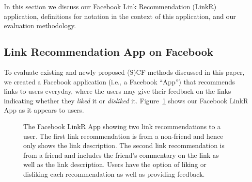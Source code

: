 In this section we discuss our Facebook Link Recommendation
(LinkR) application, definitions for 
notation in the context of this application, and our evaluation
methodology.

\subsection{Link Recommendation App on Facebook}

To evaluate existing and newly proposed (S)CF methods discussed in
this paper, we created a Facebook application (i.e., a Facebook
``App'') that recommends links to users everyday, where the users may
give their feedback on the links indicating whether they \emph{liked}
it or \emph{disliked} it.  Figure~\ref{fig:linkr_app} shows 
our Facebook LinkR App as it appears to users.

\begin{figure}[t!]
\hspace{-2mm} 
\caption{The Facebook LinkR App showing two link recommendations to a 
user.  The first link recommendation is from a non-friend and hence only
shows the link description.  The second link recommendation is from a
friend and includes the friend's commentary on the link as well as the
link description.  Users have the option of liking or disliking each
recommendation as well as providing feedback.}
\label{fig:linkr_app}
\end{figure}


